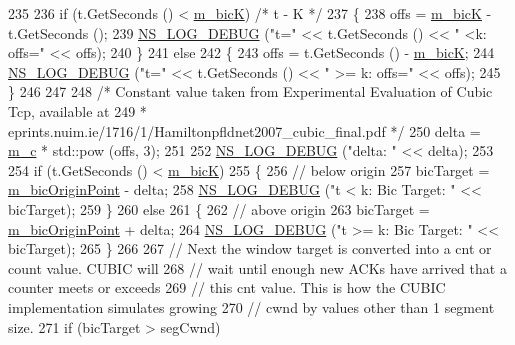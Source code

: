 \begin{DoxyCode}
235 
236   \textcolor{keywordflow}{if} (t.GetSeconds () < \hyperlink{classns3_1_1TcpCubic_a2eb43ad263dbf87c343bbdaeea7eefc7}{m\_bicK})       \textcolor{comment}{/* t - K */}
237     \{
238       offs = \hyperlink{classns3_1_1TcpCubic_a2eb43ad263dbf87c343bbdaeea7eefc7}{m\_bicK} - t.GetSeconds ();
239       \hyperlink{group__logging_ga413f1886406d49f59a6a0a89b77b4d0a}{NS\_LOG\_DEBUG} (\textcolor{stringliteral}{"t="} << t.GetSeconds () << \textcolor{stringliteral}{" <k: offs="} << offs);
240     \}
241   \textcolor{keywordflow}{else}
242     \{
243       offs = t.GetSeconds () - \hyperlink{classns3_1_1TcpCubic_a2eb43ad263dbf87c343bbdaeea7eefc7}{m\_bicK};
244       \hyperlink{group__logging_ga413f1886406d49f59a6a0a89b77b4d0a}{NS\_LOG\_DEBUG} (\textcolor{stringliteral}{"t="} << t.GetSeconds () << \textcolor{stringliteral}{" >= k: offs="} << offs);
245     \}
246 
247 
248   \textcolor{comment}{/* Constant value taken from Experimental Evaluation of Cubic Tcp, available at}
249 \textcolor{comment}{   * eprints.nuim.ie/1716/1/Hamiltonpfldnet2007\_cubic\_final.pdf */}
250   delta = \hyperlink{classns3_1_1TcpCubic_acb9bb68447f9a9e0eb0cb1f95eb7aca7}{m\_c} * std::pow (offs, 3);
251 
252   \hyperlink{group__logging_ga413f1886406d49f59a6a0a89b77b4d0a}{NS\_LOG\_DEBUG} (\textcolor{stringliteral}{"delta: "} << delta);
253 
254   \textcolor{keywordflow}{if} (t.GetSeconds () < \hyperlink{classns3_1_1TcpCubic_a2eb43ad263dbf87c343bbdaeea7eefc7}{m\_bicK})
255     \{
256       \textcolor{comment}{// below origin}
257       bicTarget = \hyperlink{classns3_1_1TcpCubic_a10fb71cdb4155d6e61174690e6bc295a}{m\_bicOriginPoint} - delta;
258       \hyperlink{group__logging_ga413f1886406d49f59a6a0a89b77b4d0a}{NS\_LOG\_DEBUG} (\textcolor{stringliteral}{"t < k: Bic Target: "} << bicTarget);
259     \}
260   \textcolor{keywordflow}{else}
261     \{
262       \textcolor{comment}{// above origin}
263       bicTarget = \hyperlink{classns3_1_1TcpCubic_a10fb71cdb4155d6e61174690e6bc295a}{m\_bicOriginPoint} + delta;
264       \hyperlink{group__logging_ga413f1886406d49f59a6a0a89b77b4d0a}{NS\_LOG\_DEBUG} (\textcolor{stringliteral}{"t >= k: Bic Target: "} << bicTarget);
265     \}
266 
267   \textcolor{comment}{// Next the window target is converted into a cnt or count value. CUBIC will}
268   \textcolor{comment}{// wait until enough new ACKs have arrived that a counter meets or exceeds}
269   \textcolor{comment}{// this cnt value. This is how the CUBIC implementation simulates growing}
270   \textcolor{comment}{// cwnd by values other than 1 segment size.}
271   \textcolor{keywordflow}{if} (bicTarget > segCwnd)

\end{DoxyCode}
